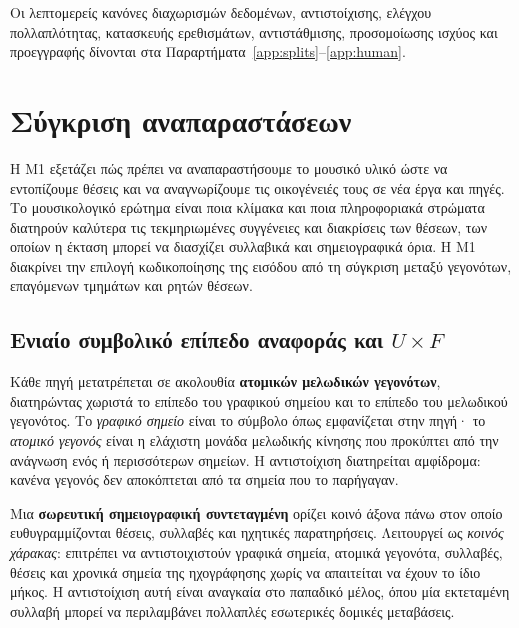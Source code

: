 \documentclass[11pt,a4paper]{article}
\begin{document}
Οι λεπτομερείς κανόνες διαχωρισμών δεδομένων, αντιστοίχισης, ελέγχου πολλαπλότητας, κατασκευής ερεθισμάτων, αντιστάθμισης, προσομοίωσης ισχύος και προεγγραφής δίνονται στα Παραρτήματα~\ref{app:splits}--\ref{app:human}.

\section{Σύγκριση αναπαραστάσεων}\label{sec:m1}

Η M1 εξετάζει πώς πρέπει να αναπαραστήσουμε το μουσικό υλικό ώστε να εντοπίζουμε θέσεις και να αναγνωρίζουμε τις οικογένειές τους σε νέα έργα και πηγές. Το μουσικολογικό ερώτημα είναι ποια κλίμακα και ποια πληροφοριακά στρώματα διατηρούν καλύτερα τις τεκμηριωμένες συγγένειες και διακρίσεις των θέσεων, των οποίων η έκταση μπορεί να διασχίζει συλλαβικά και σημειογραφικά όρια. Η M1 διακρίνει την επιλογή κωδικοποίησης της εισόδου από τη σύγκριση μεταξύ γεγονότων, επαγόμενων τμημάτων και ρητών θέσεων.

\subsection{Ενιαίο συμβολικό επίπεδο αναφοράς και \texorpdfstring{$U\times F$}{U x F}}

Κάθε πηγή μετατρέπεται σε ακολουθία \textbf{ατομικών μελωδικών γεγονότων}, διατηρώντας χωριστά το επίπεδο του γραφικού σημείου και το επίπεδο του μελωδικού γεγονότος. Το \emph{γραφικό σημείο} είναι το σύμβολο όπως εμφανίζεται στην πηγή· το \emph{ατομικό γεγονός} είναι η ελάχιστη μονάδα μελωδικής κίνησης που προκύπτει από την ανάγνωση ενός ή περισσότερων σημείων. Η αντιστοίχιση διατηρείται αμφίδρομα: κανένα γεγονός δεν αποκόπτεται από τα σημεία που το παρήγαγαν.

Μια \textbf{σωρευτική σημειογραφική συντεταγμένη} ορίζει κοινό άξονα πάνω στον οποίο ευθυγραμμίζονται θέσεις, συλλαβές και ηχητικές παρατηρήσεις. Λειτουργεί ως \emph{κοινός χάρακας}: επιτρέπει να αντιστοιχιστούν γραφικά σημεία, ατομικά γεγονότα, συλλαβές, θέσεις και χρονικά σημεία της ηχογράφησης χωρίς να απαιτείται να έχουν το ίδιο μήκος. Η αντιστοίχιση αυτή είναι αναγκαία στο παπαδικό μέλος, όπου μία εκτεταμένη συλλαβή μπορεί να περιλαμβάνει πολλαπλές εσωτερικές δομικές μεταβάσεις.
\end{document}
